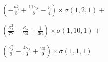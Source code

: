 $\left(- \frac{\kappa_{\lambda}^{2}}{8} + \frac{11 \kappa_{\lambda}}{8} - \frac{5}{4}\right) \times \sigma{\left(1,2,1 \right)} +$

$ \left(\frac{\kappa_{\lambda}^{2}}{72} - \frac{\kappa_{\lambda}}{24} + \frac{1}{36}\right) \times \sigma{\left(1,10,1 \right)} +$

$ \left(\frac{\kappa_{\lambda}^{2}}{9} - \frac{4 \kappa_{\lambda}}{3} + \frac{20}{9}\right) \times \sigma{\left(1,1,1 \right)}$
